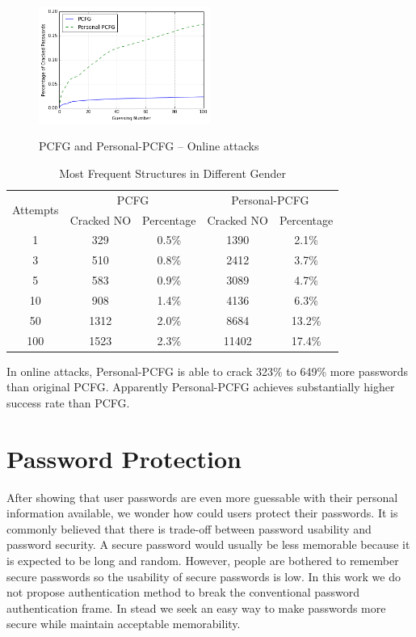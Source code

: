 \documentclass{sig-alternate}
\begin{document}
\begin{figure}[h!]
\centering
  \caption{PCFG and Personal-PCFG -- Online attacks}{}
  \label{cmp100}
  \centering
    \includegraphics[width=0.5\textwidth]{fig/cmp100}
\end{figure}

\begin{table}
\centering
\caption{Most Frequent Structures in Different Gender}
\begin{adjustbox}{max width=0.48\textwidth}
\begin{tabular}{|c|c|c|c|c|} \hline
\multirow{2}{*}{Attempts}&\multicolumn{2}{|c|}{PCFG}&\multicolumn{2}{|c|}{Personal-PCFG}\\ \cline{2-5}
&Cracked NO&Percentage&Cracked NO&Percentage\\ \hline
1 & 329 & 0.5\% & 1390 & 2.1\% \\
3 & 510 & 0.8\% & 2412 & 3.7\%\\
5 & 583 & 0.9\% & 3089 & 4.7\%\\
10 & 908 & 1.4\% & 4136 & 6.3\%\\
50 & 1312 & 2.0\% & 8684 & 13.2\%\\
100 & 1523 & 2.3\% & 11402 & 17.4\%\\
\hline\end{tabular}
\end{adjustbox}
\label{cmp100t}
\end{table}

In online attacks, Personal-PCFG is able to crack 323\% to 649\% more passwords than original PCFG. Apparently Personal-PCFG achieves substantially higher success rate than PCFG. 


\section{Password Protection}
\label{passwordprotection}
After showing that user passwords are even more guessable with their personal information available, we wonder how could users protect their passwords. It is commonly believed that there is trade-off between password usability and password security. A secure password would usually be less memorable because it is expected to be long and random. However, people are bothered to remember secure passwords so the usability of secure passwords is low. In this work we do not propose authentication method to break the conventional password authentication frame. In stead we seek an easy way to make passwords more secure while maintain acceptable memorability.
\end{document}
